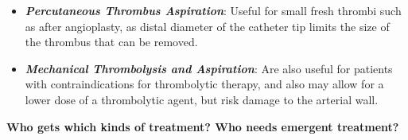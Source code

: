 \documentclass[
]{book}
\begin{document}
\begin{itemize}
\begin{itemize}
    \begin{itemize}
    \item
      Absolute contraindications include active bleeding disorder,
      CVA (\textless6mo), CNS injury or head injury (\textless3mo), or GI bleed
      (\textless10d).
    \item
      Relative contraindications include recent major surgery,
      uncontrolled hypertension, intracranial tumor, pregnancy,
      recent eye surgery, hepatic failure, CPR (\textless10d), or
      bacterial endocarditis.
    \item
      1-2\% risk of hemorrhagic stroke. If neurologic deficit
      develops during thrombolysis, stop lysis and perform
      immediate CT head.
      \citep{ourielComparisonRecombinantUrokinase1998}
    \end{itemize}
  \item
    \textbf{\emph{Percutaneous Thrombus Aspiration}}: Useful for small fresh
    thrombi such as after angioplasty, as distal diameter of the
    catheter tip limits the size of the thrombus that can be
    removed.~
  \item
    \textbf{\emph{Mechanical Thrombolysis and Aspiration}}: Are also useful for
    patients with contraindications for thrombolytic therapy, and
    also may allow for a lower dose of a thrombolytic agent, but
    risk damage to the arterial wall.
  \end{itemize}
\end{itemize}

\textbf{Who gets which kinds of treatment? Who needs emergent treatment?}
\end{document}
